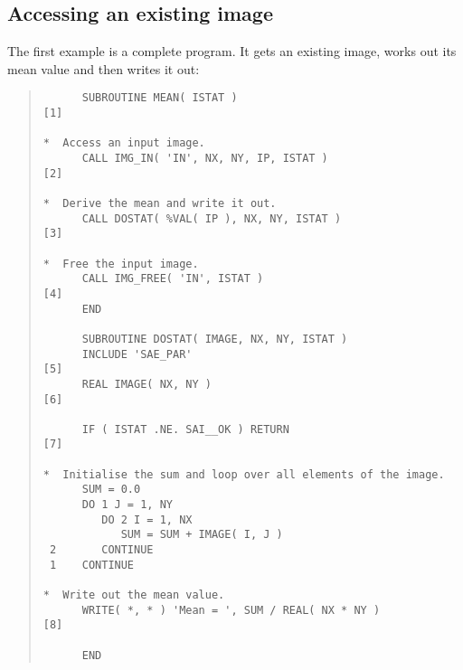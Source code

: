 \documentclass[twoside,11pt]{article}
\renewcommand{\_}{\texttt{\symbol{95}}}
\newenvironment{code}{\begin{small} \begin{quote}}
                     {\end{quote} \end{small}}
\begin{document}
\subsection{Accessing \label{IMGMEAN}an existing image}
The first example is a complete program. It gets an existing image,
works out its mean value and then writes it out:
\begin{code}
\begin{verbatim}
      SUBROUTINE MEAN( ISTAT )                                [1]

*  Access an input image.
      CALL IMG_IN( 'IN', NX, NY, IP, ISTAT )                  [2]

*  Derive the mean and write it out.
      CALL DOSTAT( %VAL( IP ), NX, NY, ISTAT )                [3]

*  Free the input image.
      CALL IMG_FREE( 'IN', ISTAT )                            [4]
      END

      SUBROUTINE DOSTAT( IMAGE, NX, NY, ISTAT )
      INCLUDE 'SAE_PAR'                                       [5]
      REAL IMAGE( NX, NY )                                    [6]

      IF ( ISTAT .NE. SAI__OK ) RETURN                        [7]

*  Initialise the sum and loop over all elements of the image.
      SUM = 0.0
      DO 1 J = 1, NY
         DO 2 I = 1, NX
            SUM = SUM + IMAGE( I, J )
 2       CONTINUE
 1    CONTINUE

*  Write out the mean value.
      WRITE( *, * ) 'Mean = ', SUM / REAL( NX * NY )          [8]

      END
\end{verbatim}
\end{code}
\end{document}
